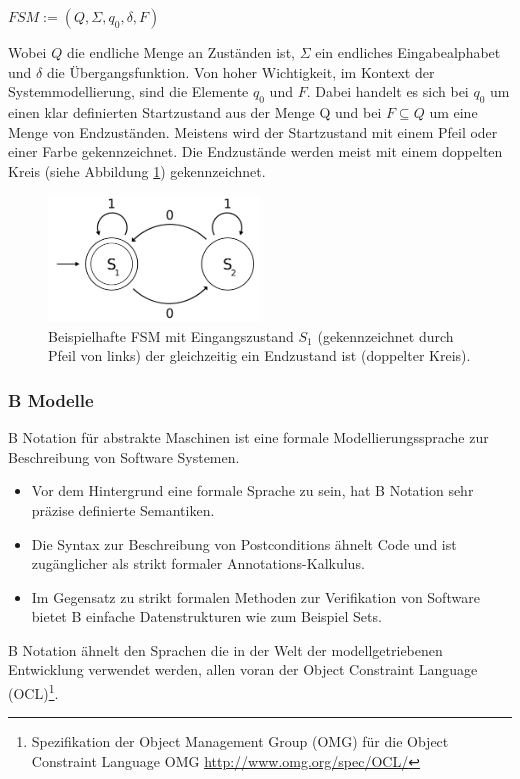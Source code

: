 \begin{center}
$FSM := (Q, \Sigma, q_0, \delta, F)$
\end{center}

Wobei $Q$ die endliche Menge an Zuständen ist, $\Sigma$ ein endliches Eingabealphabet und $\delta$ die Übergangsfunktion. Von hoher Wichtigkeit, im Kontext der Systemmodellierung, sind die Elemente $q_0$ und $F$. Dabei handelt es sich bei $q_0$ um einen klar definierten Startzustand aus der Menge Q und bei $F \subseteq Q$ um eine Menge von Endzuständen. Meistens wird der Startzustand mit einem Pfeil oder einer Farbe gekennzeichnet. Die Endzustände werden meist mit einem doppelten Kreis (siehe Abbildung \ref{fig:fsm_example}) gekennzeichnet.

\begin{figure}[h] 
  \centering
     \includegraphics[width=0.5\textwidth]{figures/FSM_example.png}
  \caption{Beispielhafte FSM mit Eingangszustand $S_1$ (gekennzeichnet durch Pfeil von links) der gleichzeitig ein Endzustand ist (doppelter Kreis).}
  \label{fig:fsm_example}
\end{figure}

\subsubsection{B Modelle}
B Notation für abstrakte Maschinen ist eine formale Modellierungssprache zur Beschreibung von Software Systemen.
\begin{itemize}
\item Vor dem Hintergrund eine formale Sprache zu sein, hat B Notation sehr präzise definierte Semantiken.
\item Die Syntax zur Beschreibung von Postconditions ähnelt Code und ist zugänglicher als strikt formaler Annotations-Kalkulus\cite{huth_logic_2004}.
\item Im Gegensatz zu strikt formalen Methoden zur Verifikation von Software bietet B einfache Datenstrukturen wie zum Beispiel Sets.
\end{itemize}

B Notation ähnelt den Sprachen die in der Welt der modellgetriebenen Entwicklung verwendet werden, allen voran der Object Constraint Language (OCL)\footnote{Spezifikation der Object Management Group (OMG) für die Object Constraint Language\cite{warmer_object_2004} OMG \url{http://www.omg.org/spec/OCL/}}.
